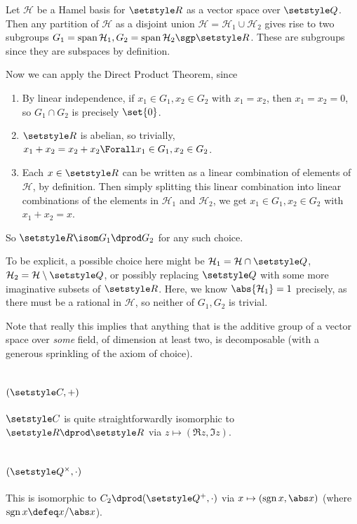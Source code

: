 \documentclass[fleqn,a4paper,11pt]{article}
\begin{document}
Let \(\mathcal H\) be a Hamel basis for \(\R\) as a vector space over \(\Q\).
Then any partition of \(\mathcal H\) as a disjoint union
\(\mathcal H = \mathcal H_1 \cup \mathcal H_2\) gives rise to two subgroups
\(G_1 = \vspan \mathcal H_1, G_2 = \vspan \mathcal H_2 \sgp \R\). These are
subgroups since they are subspaces by definition.

Now we can apply the Direct Product Theorem, since
\begin{enumerate}[label=(\roman*)]
 \item
  By linear independence, if \(x_1 \in G_1, x_2 \in G_2\) with \(x_1 = x_2\),
  then \(x_1 = x_2 = 0\), so \(G_1 \cap G_2\) is precisely \(\set{0}\).
 \item
  \(\R\) is abelian, so trivially,
  \(x_1 + x_2 = x_2 + x_2 \Forall x_1 \in G_1, x_2 \in G_2\).
 \item
  Each \(x \in \R\) can be written as a linear combination of elements of
  \(\mathcal H\), by definition. Then simply splitting this linear combination
  into linear combinations of the elements in \(\mathcal H_1\) and
  \(\mathcal H_2\), we get \(x_1 \in G_1, x_2 \in G_2\) with \(x_1 + x_2 = x\).
\end{enumerate}
So \(\R \isom G_1 \dprod G_2\) for any such choice.

To be explicit, a possible choice here might be
\(\mathcal H_1 = \mathcal H \cap \Q\),
\(\mathcal H_2 = \mathcal H \setminus \Q\), or possibly replacing \(\Q\) with
some more imaginative subsets of \(\R\). Here, we know
\(\abs{\mathcal H_1} = 1\) precisely, as there must be a rational in
\(\mathcal H\), so neither of \(G_1, G_2\) is trivial.

Note that really this implies that anything that is the additive group of a
vector space over \emph{some} field, of dimension at least two, is decomposable
(with a generous sprinkling of the axiom of choice).

\section{\((\CC, +)\)}

\(\CC\) is quite straightforwardly isomorphic to \(\R \dprod \R\) via \(z
\mapsto (\Re z, \Im z)\).

\section{\((\Q^\times, \cdot)\)}

This is isomorphic to \(C_2 \dprod (\Q^+, \cdot)\) via
\(x \mapsto (\sgn x, \abs x)\) (where \(\sgn x \defeq x/\abs x\)).
\end{document}
